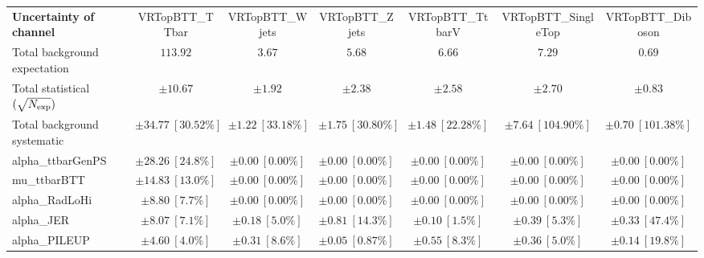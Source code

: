 
\begin{sidewaystable}
\begin{center}
\setlength{\tabcolsep}{0.0pc}
\begin{tabular*}{\textwidth}{@{\extracolsep{\fill}}lcccccc}
\noalign{\smallskip}\hline\noalign{\smallskip}
{\bf Uncertainty of channel}                                    & VRTopBTT\_TTbar            & VRTopBTT\_Wjets            & VRTopBTT\_Zjets            & VRTopBTT\_TtbarV            & VRTopBTT\_SingleTop            & VRTopBTT\_Diboson            \\
\noalign{\smallskip}\hline\noalign{\smallskip}
Total background expectation             &  $113.92$        &  $3.67$        &  $5.68$        &  $6.66$        &  $7.29$        &  $0.69$       \\
\noalign{\smallskip}\hline\noalign{\smallskip}
Total statistical $(\sqrt{N_{\rm exp}})$              & $\pm 10.67$        & $\pm 1.92$        & $\pm 2.38$        & $\pm 2.58$        & $\pm 2.70$        & $\pm 0.83$       \\
Total background systematic               & $\pm 34.77\ [30.52\%] $        & $\pm 1.22\ [33.18\%] $        & $\pm 1.75\ [30.80\%] $        & $\pm 1.48\ [22.28\%] $        & $\pm 7.64\ [104.90\%] $        & $\pm 0.70\ [101.38\%] $             \\
\noalign{\smallskip}\hline\noalign{\smallskip}
\noalign{\smallskip}\hline\noalign{\smallskip}
alpha\_ttbarGenPS         & $\pm 28.26\ [24.8\%] $          & $\pm 0.00\ [0.00\%] $          & $\pm 0.00\ [0.00\%] $          & $\pm 0.00\ [0.00\%] $          & $\pm 0.00\ [0.00\%] $          & $\pm 0.00\ [0.00\%] $       \\
mu\_ttbarBTT         & $\pm 14.83\ [13.0\%] $          & $\pm 0.00\ [0.00\%] $          & $\pm 0.00\ [0.00\%] $          & $\pm 0.00\ [0.00\%] $          & $\pm 0.00\ [0.00\%] $          & $\pm 0.00\ [0.00\%] $       \\
alpha\_RadLoHi         & $\pm 8.80\ [7.7\%] $          & $\pm 0.00\ [0.00\%] $          & $\pm 0.00\ [0.00\%] $          & $\pm 0.00\ [0.00\%] $          & $\pm 0.00\ [0.00\%] $          & $\pm 0.00\ [0.00\%] $       \\
alpha\_JER         & $\pm 8.07\ [7.1\%] $          & $\pm 0.18\ [5.0\%] $          & $\pm 0.81\ [14.3\%] $          & $\pm 0.10\ [1.5\%] $          & $\pm 0.39\ [5.3\%] $          & $\pm 0.33\ [47.4\%] $       \\
alpha\_PILEUP         & $\pm 4.60\ [4.0\%] $          & $\pm 0.31\ [8.6\%] $          & $\pm 0.05\ [0.87\%] $          & $\pm 0.55\ [8.3\%] $          & $\pm 0.36\ [5.0\%] $          & $\pm 0.14\ [19.8\%] $       \\

\end{tabular*}
\end{center}
\end{sidewaystable}
